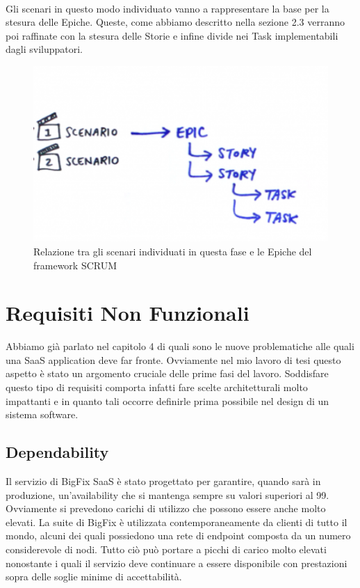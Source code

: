\paragraph{}
Gli scenari in questo modo individuato vanno a rappresentare la base per la stesura delle Epiche. Queste, come abbiamo descritto nella sezione 2.3 verranno poi raffinate con la stesura delle Storie e infine divide nei Task implementabili dagli sviluppatori.
\begin{figure} [h!]
	\centering
	\includegraphics[width=0.7\linewidth]{capitoli/imgs/scenario.PNG}
	\caption{Relazione tra gli scenari individuati in questa fase e le Epiche del framework SCRUM}
	\label{fig:scentospic}
\end{figure}

\section{Requisiti Non Funzionali}
Abbiamo già parlato nel capitolo 4 di quali sono le nuove problematiche alle quali una SaaS application deve far fronte. Ovviamente nel mio lavoro di tesi questo aspetto è stato un argomento cruciale delle prime fasi del lavoro. Soddisfare questo tipo di requisiti comporta infatti fare scelte architetturali molto impattanti e in quanto tali occorre definirle prima possibile nel design di un sistema software. 

\subsection{Dependability}
Il servizio di BigFix SaaS è stato progettato per garantire, quando sarà in produzione, un'availability che si mantenga sempre su valori superiori al 99. Ovviamente si prevedono carichi di utilizzo che possono essere anche molto elevati. La suite di BigFix è utilizzata contemporaneamente da clienti di tutto il mondo, alcuni dei quali possiedono una rete di endpoint composta da un numero considerevole di nodi. Tutto ciò può portare a picchi di carico molto elevati nonostante i quali il servizio deve continuare a essere disponibile con prestazioni sopra delle soglie minime di accettabilità.

